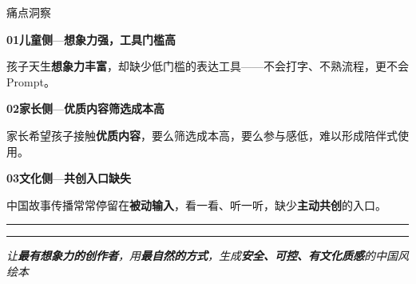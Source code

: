\documentclass{beamer}
\newcommand{\kw}[1]{\textcolor{importantred}{\textbf{#1}}}
\newcommand{\ornamentrule}{%
  \par\vspace{4pt}%
  {\centering\textcolor{accentgold!75}{\rule[0.38em]{0.30\linewidth}{0.4pt}}\hspace{0.4em}{\color{buptred}\small$\blacklozenge$}\hspace{0.4em}\textcolor{accentgold!75}{\rule[0.38em]{0.30\linewidth}{0.4pt}}\par}%
  \vspace{3pt}%
}
\newcommand{\bignum}[1]{{\fontsize{15}{17}\selectfont\bfseries\color{buptred}#1}}
\newcommand{\heroline}[1]{%
  {\centering\color{darkred}\itshape\small #1\par}%
}
\begin{document}
\begin{frame}[t]{痛点洞察}
    \vspace{0.25cm}
    \footnotesize
    \begin{center}
    \begin{minipage}{0.86\linewidth}
    {\bignum{01}}\hspace{0.55em}\textbf{\normalsize\color{darkred}儿童侧}\;\textcolor{gray!70}{—}\;\textbf{想象力强，工具门槛高}\par
    \vspace{1pt}
    孩子天生\kw{想象力丰富}，却缺少低门槛的表达工具——不会打字、不熟流程，更不会 Prompt。
    \par\vspace{10pt}

    {\bignum{02}}\hspace{0.55em}\textbf{\normalsize\color{darkred}家长侧}\;\textcolor{gray!70}{—}\;\textbf{优质内容筛选成本高}\par
    \vspace{1pt}
    家长希望孩子接触\kw{优质内容}，要么筛选成本高，要么参与感低，难以形成陪伴式使用。
    \par\vspace{10pt}

    {\bignum{03}}\hspace{0.55em}\textbf{\normalsize\color{darkred}文化侧}\;\textcolor{gray!70}{—}\;\textbf{共创入口缺失}\par
    \vspace{1pt}
    中国故事传播常常停留在\kw{被动输入}，看一看、听一听，缺少\textbf{主动共创}的入口。
    \end{minipage}
    \end{center}

    \ornamentrule
    \heroline{让\textbf{最有想象力的创作者}，用\textbf{最自然的方式}，生成\textbf{安全、可控、有文化质感}的中国风绘本}
\end{frame}
\end{document}
